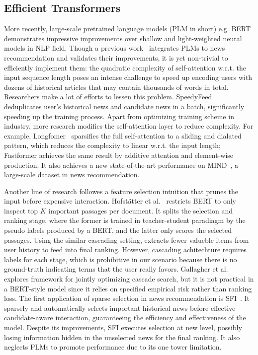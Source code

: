 \documentclass[sigconf,anonymous]{acmart}
\begin{document}
\subsection{Efficient Transformers}
More recently, large-scale pretrained language models (PLM in short) e.g. BERT~\cite{Bert} demonstrates impressive improvements over shallow and light-weighted neural models in NLP field. Though a previous work~\cite{wu_newsPLM} integrates PLMs to news recommendation and validates their improvements, it is yet non-trivial to efficiently implement them: the quadratic complexity of self-attention w.r.t. the input sequence length poses an intense challenge to speed up encoding users with dozens of historical articles that may contain thousands of words in total. Researchers make a lot of efforts to lessen this problem. SpeedyFeed~\cite{xiao_speedy} deduplicates user's historical news and candidate news in a batch, significantly speeding up the training process. Apart from optimizing training scheme in industry, more research modifies the self-attention layer to reduce complexity. For example, Longfomer~\cite{Longformer} sparsifies the full self-attention to a sliding and dialated pattern, which reduces the complexity to linear w.r.t. the input length; Fastformer achieves the same result by additive attention and element-wise production. It also achieves a new state-of-the-art performance on MIND~\cite{wu_MIND}, a large-scale dataset in news recommendation.

Another line of research followes a feature selection intuition that prunes the input before expensive interaction. Hofstätter et al.~\cite{Intra-Document-Cascading}
restricts BERT to only inspect top $K$ important passages per document. It splits the selection and ranking stage, where the former is trained in teacher-student paradiagm by the pseudo labels produced by a BERT, and the latter only scores the selected passages. Using the similar cascading setting, \citet{ali_SIM} extracts fewer valueble items from user history to feed into final ranking. However, cascading achitechture requires labels for each stage, which is prohibitive in our scenario because there is no ground-truth indicating terms that the user really favors. Gallagher et al.~\cite{gallagher_joint_cascade} explores framework for jointly optimizing cascade search, but it is not practical in a BERT-style model since it relies on specified empirical risk rather than ranking loss. The first application of sparse selection in news recommendation is SFI~\cite{zpt}. It sparsely and automatically selects important historical news before effective candidate-aware interaction, guaranteeing the efficiency and effectiveness of the model. Despite its improvements, SFI executes selection at new level, possibly losing information hidden in the unselected news for the final ranking. It also neglects PLMs to promote performance due to its one tower limitation.
\end{document}
